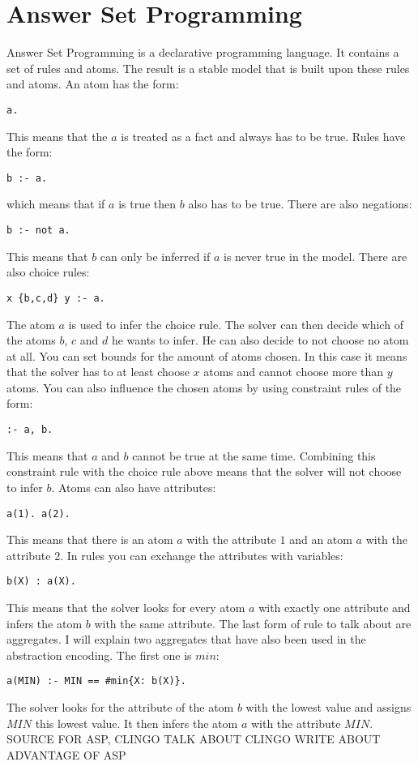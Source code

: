 \documentclass[runningheads]{llncs}
\begin{document}
\section{Answer Set Programming}
Answer Set Programming is a declarative programming language. It contains a set of rules and atoms. The result is a stable model that is built upon these rules and atoms. An atom has the form: 
\begin{verbatim}
a.
\end{verbatim}
This means that the $a$ is treated as a fact and always has to be true. Rules have the form:
\begin{verbatim}
b :- a.
\end{verbatim}
which means that if $a$ is true then $b$ also has to be true. There are also negations:
\begin{verbatim}
b :- not a.
\end{verbatim}
This means that $b$ can only be inferred if $a$ is never true in the model. There are also choice rules:
\begin{verbatim}
x {b,c,d} y :- a.
\end{verbatim}
The atom $a$ is used to infer the choice rule. The solver can then decide which of the atoms $b$, $c$ and $d$ he wants to infer. He can also decide to not choose no atom at all. You can set bounds for the amount of atoms chosen. In this case it means that the solver has to at least choose $x$ atoms and cannot choose more than $y$ atoms. You can also influence the chosen atoms by using constraint rules of the form:
\begin{verbatim}
:- a, b.
\end{verbatim}
This means that $a$ and $b$ cannot be true at the same time. Combining this constraint rule with the choice rule above means that the solver will not choose to infer $b$. Atoms can also have attributes:
\begin{verbatim}
a(1). a(2).
\end{verbatim}
This means that there is an atom $a$ with the attribute $1$ and an atom $a$ with the attribute $2$. In rules you can exchange the attributes with variables:
\begin{verbatim}
b(X) : a(X).
\end{verbatim}
This means that the solver looks for every atom $a$ with exactly one attribute and infers the atom $b$ with the same attribute.
The last form of rule to talk about are aggregates. I will explain two aggregates that have also been used in the abstraction encoding. The first one is $min$:
\begin{verbatim}
a(MIN) :- MIN == #min{X: b(X)}.
\end{verbatim}
The solver looks for the attribute of the atom $b$ with the lowest value and assigns  $MIN$ this lowest value. It then infers the atom $a$ with the attribute $MIN$.
SOURCE FOR ASP, CLINGO
TALK ABOUT CLINGO
WRITE ABOUT ADVANTAGE OF ASP
\end{document}

